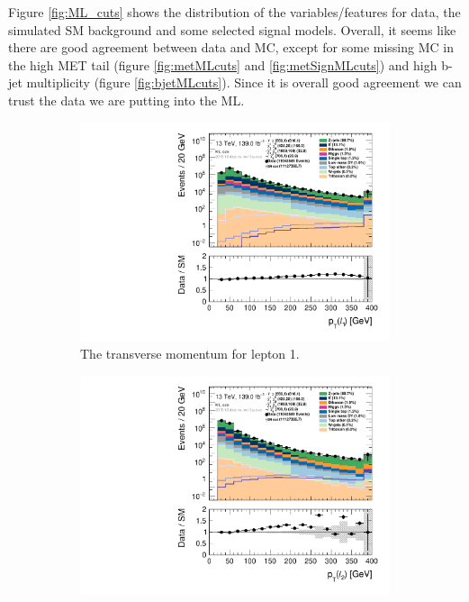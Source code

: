 Figure \ref{fig:ML_cuts} shows the distribution of the variables/features for data, the simulated SM background and some selected signal models.  Overall, it seems like there are good agreement between data and MC, except for some missing MC in the high MET tail (figure \ref{fig:metMLcuts} and \ref{fig:metSignMLcuts}) and high b-jet multiplicity (figure \ref{fig:bjetMLcuts}). Since it is overall good agreement we can trust the data we are putting into the ML.

\begin{figure}[H]
\centering
    \begin{subfigure}[t!]{0.49\textwidth}
        \includegraphics[width=\textwidth]{Figures/ML_cuts/hist1d_lepPt[0]_ML_cuts.pdf}
    \caption{The transverse momentum for lepton 1.}
    \label{fig:my_label}
    \end{subfigure}
    \begin{subfigure}[t!]{0.49\textwidth}
        \includegraphics[width=\textwidth]{Figures/ML_cuts/hist1d_lepPt[1]_ML_cuts.pdf}

\end{subfigure}
\end{figure}
